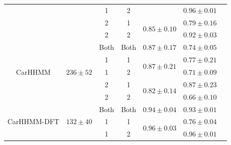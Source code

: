 \begin{table}[ht]
{\begin{tabular}{ccccccc}
                            &                                    & 1                             & 2                                &                                   & $0.96 \pm 0.01$                       \\ 
                            &                                    & 2                             & 1                                & \multirow{2}{*}{$0.85 \pm 0.10$}    & $0.79 \pm 0.16$                       \\ 
                            &                                    & 2                             & 2                                &                                   & $0.92 \pm 0.03$                       \\ \hline
\multirow{5}{*}{CarHHMM}    & \multirow{5}{*}{$236 \pm 52$}   & Both                          & Both                             & $0.87 \pm 0.17$                   & $0.74 \pm 0.05$                       \\
                            &                                    & 1                             & 1                                & \multirow{2}{*}{$0.87 \pm 0.21$}    & $0.77 \pm 0.21$                       \\ 
                            &                                    & 1                             & 2                                &                                   & $0.71 \pm 0.09$                       \\ 
                            &                                    & 2                             & 1                                & \multirow{2}{*}{$0.82 \pm 0.14$}    & $0.87 \pm 0.23$                       \\ 
                            &                                    & 2                             & 2                                &                                   & $0.66 \pm 0.10$                       \\ \hline
\multirow{5}{*}{CarHHMM-DFT}& \multirow{5}{*}{$132 \pm 40$}   & Both                          & Both                             & $0.94 \pm 0.04$                   & $0.93 \pm 0.01$                       \\
                            &                                    & 1                             & 1                                & \multirow{2}{*}{$0.96 \pm 0.03$}    & $0.76 \pm 0.04$                       \\ 
                            &                                    & 1                             & 2                                &                                   & $0.96 \pm 0.01$                       \\ 

\end{tabular}}
\end{table}
